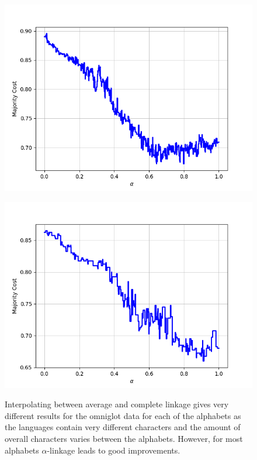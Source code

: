 \begin{figure}[h]
\begin{minipage}{.19\textwidth}
  {\includegraphics[width=\linewidth]{plots/omniglot-intra-ac/Tagalog}}
\end{minipage}
\begin{minipage}{.19\textwidth}
  \centering
  {\includegraphics[width=\linewidth]{plots/omniglot-intra-ac/Tifinagh}}
\end{minipage}
\caption{%
  Interpolating between average and complete linkage gives very different results for the omniglot data for each of the alphabets as the languages contain very different characters and the amount of overall characters varies between the alphabets. However, for most alphabets $\alpha$-linkage leads to good improvements.}
\label{}
\end{figure}

